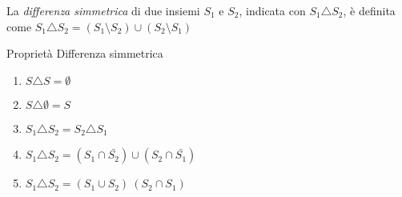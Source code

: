 La \textit{differenza simmetrica} di due insiemi $S_1$ e $S_2$, indicata con $S_1 \triangle S_2$,
è definita come $S_1 \triangle S_2 = (S_1 \setminus S_2) \cup (S_2 \setminus S_1) $

\begin{prop}
Proprietà Differenza simmetrica
\end{prop}
\begin{enumerate}
  \item $S \triangle S = \emptyset$
  \item $S \triangle \emptyset = S$
  \item $S_1 \triangle S_2 = S_2 \triangle S_1$
  \item $S_1 \triangle S_2 = (S_1 \cap \bar{S_2}) \cup (S_2 \cap \bar{S_1})$
  \item $S_1 \triangle S_2 = (S_1 \cup S_2) \ (S_2 \cap S_1)$
\end{enumerate}
